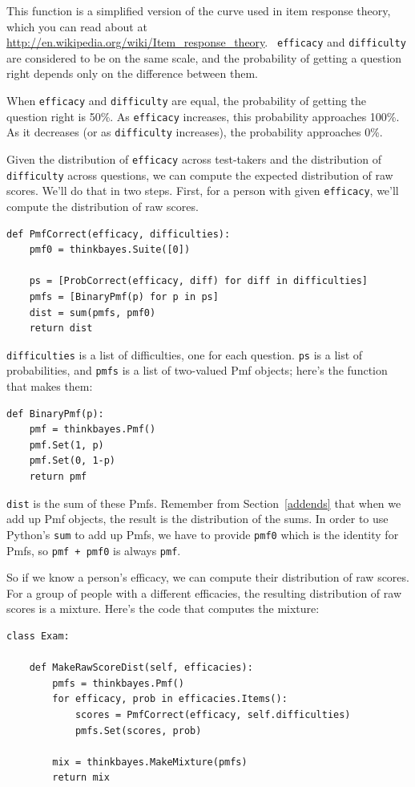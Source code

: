 \documentclass[12pt]{book}
\begin{document}
This function is a simplified version of the curve used in item
response theory, which you can read about at
\url{http://en.wikipedia.org/wiki/Item_response_theory}.  {\tt
  efficacy} and {\tt difficulty} are considered to be on the same
scale, and the probability of getting a question right depends only on
the difference between them.

When {\tt efficacy} and {\tt difficulty} are equal, the
probability of getting the question right is 50\%.  As
{\tt efficacy} increases, this probability approaches 100\%.
As it decreases (or as {\tt difficulty} increases), the
probability approaches 0\%.

Given the distribution of {\tt efficacy} across test-takers
and the distribution of {\tt difficulty} across questions, we
can compute the expected distribution of raw scores.  We'll do that
in two steps.  First, for a person with given {\tt efficacy},
we'll compute the distribution of raw scores.

\begin{verbatim}
def PmfCorrect(efficacy, difficulties):
    pmf0 = thinkbayes.Suite([0])

    ps = [ProbCorrect(efficacy, diff) for diff in difficulties]
    pmfs = [BinaryPmf(p) for p in ps]
    dist = sum(pmfs, pmf0)
    return dist
\end{verbatim}

{\tt difficulties} is a list of difficulties, one for each question.
{\tt ps} is a list of probabilities, and {\tt pmfs} is a list of
two-valued Pmf objects; here's the function that makes them:

\begin{verbatim}
def BinaryPmf(p):
    pmf = thinkbayes.Pmf()
    pmf.Set(1, p)
    pmf.Set(0, 1-p)
    return pmf
\end{verbatim}

{\tt dist} is the sum of these Pmfs.  Remember from Section~\ref{addends}
that when we add up Pmf objects, the result is the distribution
of the sums.  In order to use Python's {\tt sum} to add up Pmfs,
we have to provide {\tt pmf0} which is the identity for Pmfs,
so {\tt pmf + pmf0} is always {\tt pmf}.

So if we know a person's efficacy, we can compute their distribution
of raw scores.  For a group of people with a different efficacies, the
resulting distribution of raw scores is a mixture.  Here's the code
that computes the mixture:

\begin{verbatim}
class Exam:

    def MakeRawScoreDist(self, efficacies):
        pmfs = thinkbayes.Pmf()
        for efficacy, prob in efficacies.Items():
            scores = PmfCorrect(efficacy, self.difficulties)
            pmfs.Set(scores, prob)

        mix = thinkbayes.MakeMixture(pmfs)
        return mix
\end{verbatim}
\end{document}

